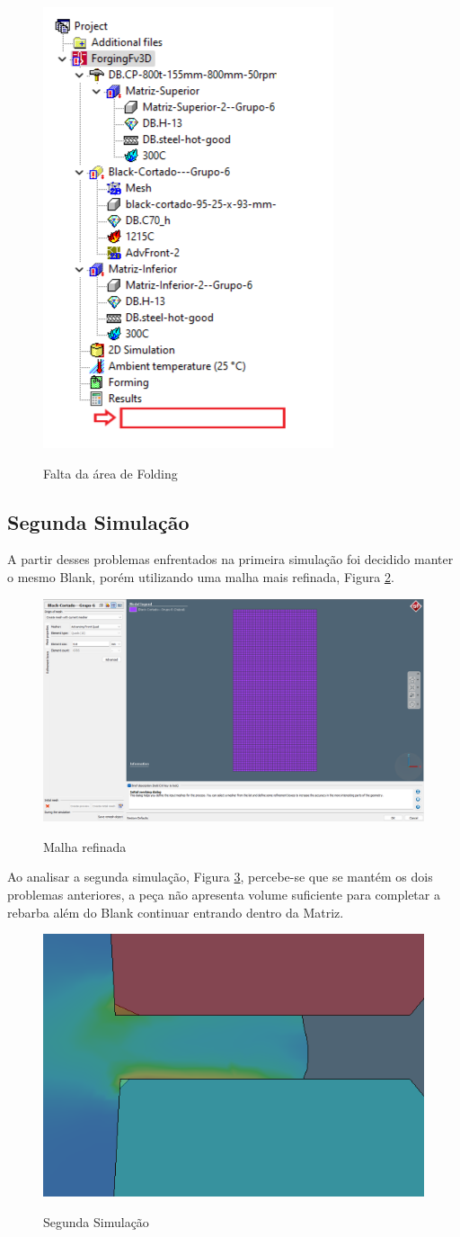 \documentclass[deposito, acronym, symbols]{fei}
\begin{document}
\begin{figure}[!htp]
    \centering
    \caption{Falta da área de Folding}
    \includegraphics[width=0.3\linewidth]{Imagens/Simufact - Sem a dobra.png}
    \label{fig:dobra}
\end{figure}

\newpage

\subsection{Segunda Simulação}

A partir desses problemas enfrentados na primeira simulação foi decidido manter o mesmo Blank, porém utilizando uma malha mais refinada, Figura \ref{fig:malha2}. 

\begin{figure}[!htp]
    \centering
    \caption{Malha refinada}
    \includegraphics[width=0.7\linewidth]{Imagens/Simufact - Malha final.png}
    \label{fig:malha2}
\end{figure}

Ao analisar a segunda simulação, Figura \ref{fig:2simu}, percebe-se que se mantém os dois problemas anteriores, a peça não apresenta volume suficiente para completar a rebarba além do Blank continuar entrando dentro da Matriz.

\begin{figure}[!htp]
    \centering
    \caption{Segunda Simulação}
    \includegraphics[width=0.5\linewidth]{Imagens/Simufact - 2º Simulção com Zoom.png}
    \label{fig:2simu}
\end{figure}
\end{document}

